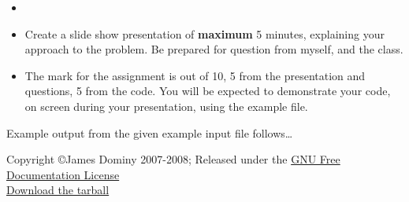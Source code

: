 \begin{enumerate}
\begin{itemize}
	\item 
	\item Create a slide show presentation of \textbf{maximum} 5 minutes, explaining your approach to the problem. Be prepared for question from myself, and the class.
	\item The mark for the assignment is out of 10, 5 from the presentation and questions, 5 from the code. You will be expected to demonstrate your code, on screen during your presentation, using the example file.
\end{itemize}     Example output from the given example input file follows\ldots    
\end{enumerate}   Copyright \copyright James Dominy 2007-2008; Released under the \href{http://www.gnu.org/copyleft/fdl.html}{GNU Free Documentation License}
\\\href{intropython.tar.gz}{Download the tarball}

